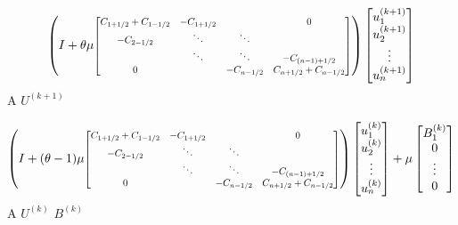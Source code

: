 \documentclass[a4paper,11pt]{article}
\theoremstyle{nonumberplain}
\theoremstyle{nonumberplain}
\begin{document}
    \begin{calculs}
        $$
        \left(
            I + \theta\mu
            \noindent
            \resizebox{0.60\linewidth}{!}{%
                $\begin{bmatrix}
                    C_{1 + 1/2} + C_{1 - 1/2} & -C_{1 + 1/2} & & 0\\
                    -C_{2 - 1/2} & \ddots & \ddots &  \\
                    & \ddots & \ddots &  -C_{(n - 1) + 1/2} \\
                    0 &  & -C_{n - 1/2} & C_{n + 1/2} + C_{n - 1/2}
                \end{bmatrix}$%
            }
        \right)
        \begin{bmatrix}
            u_{1}^{(k + 1)} \\
            u_{2}^{(k + 1)} \\
            \vdots \\
            u_{n}^{(k + 1)} \\
        \end{bmatrix}
        $$
        \hspace{42ex} A \hspace{30ex} $U^{(k + 1)}$
    \end{calculs}
    \begin{calculs}
        $$
        \left(
            I + (\theta - 1)\mu
            \noindent
            \resizebox{0.60\linewidth}{!}{%
                $\begin{bmatrix}
                    C_{1 + 1/2} + C_{1 - 1/2} & -C_{1 + 1/2} & & 0\\
                    -C_{2 - 1/2} & \ddots & \ddots &  \\
                    & \ddots & \ddots &  -C_{(n - 1) + 1/2} \\
                    0 &  & -C_{n - 1/2} & C_{n + 1/2} + C_{n - 1/2}
                \end{bmatrix}$%
            }
        \right)
        \begin{bmatrix}
            u_{1}^{(k)} \\
            u_{2}^{(k)} \\
            \vdots \\
            u_{n}^{(k)} \\
        \end{bmatrix}
        + \mu
        \begin{bmatrix}
            B_1^{(k)} \\
            0 \\
            \vdots \\
            0 \\
        \end{bmatrix}
        $$
        \hspace{42ex} A \hspace{27ex} $U^{(k)}$ \hspace{6ex} $B^{(k)}$
    \end{calculs}
\end{document}
